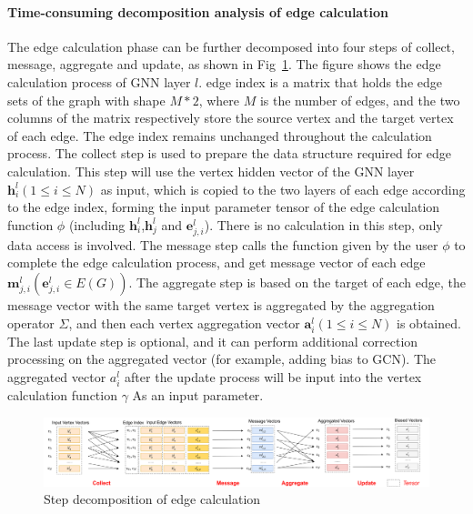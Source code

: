 \paragraph{Time-consuming decomposition analysis of edge calculation}
The edge calculation phase can be further decomposed into four steps of collect, message, aggregate and update,
as shown in Fig~\ref{fig:steps_in_edge_calculation}. The figure shows the edge calculation process of GNN layer $l$.
edge index is a matrix that holds the edge sets of the graph with shape $M*2$, where $M$ is the number of edges,
and the two columns of the matrix respectively store the source vertex and the target vertex of each edge.
The edge index remains unchanged throughout the calculation process.
The collect step is used to prepare the data structure required for edge calculation.
This step will use the vertex hidden vector of the GNN layer $\boldsymbol{h}_i^l (1 \leq i \leq N)$
as input, which is copied to the two layers of each edge according to the edge index, forming the input parameter tensor of the edge calculation function $\phi$
(including $\boldsymbol{h}_i^l$,$\boldsymbol{h}_j^ l$ and $\boldsymbol{e}_{j, i}^l$).
There is no calculation in this step, only data access is involved. The message step calls the function given by the user $\phi$ to
complete the edge calculation process, and get message vector of each edge $\boldsymbol{m}_{j, i}^l (\boldsymbol{e}_{j, i}^l \in E(G))$.
The aggregate step is based on the target of each edge, the message vector with the same target vertex is aggregated by the aggregation operator $\Sigma$,
and then each vertex aggregation vector $\boldsymbol{a}_i^l (1 \leq i \leq N)$ is obtained. 
The last update step is optional, and it can perform additional correction processing on the aggregated vector (for example, adding bias to GCN).
The aggregated vector $a_i^l$ after the update process will be input into the vertex calculation function $\gamma$ As an input parameter.

\begin{figure}
    \centering
    \includegraphics[width=1\columnwidth]{figs/illustration/steps_in_edge_calculation.png}
    \caption{Step decomposition of edge calculation}
    \label{fig:steps_in_edge_calculation}
\end{figure}

